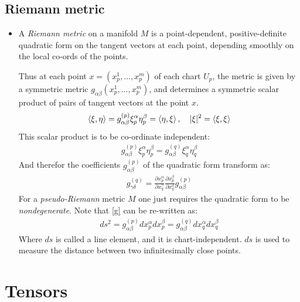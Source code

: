 \documentclass[11pt]{article}
\numberwithin{equation}{section}
\begin{document}
\subsection{Riemann metric}
\begin{itemize}
  \item A \emph{Riemann metric} on a manifold $M$ is a point-dependent, positive-definite quadratic form on the tangent vectors at each point, depending smoothly on the local co-ords of the points. 

  Thus at each point $x = (x^{1}_{p},\ldots,x^{m}_p)$ of each chart $U_{p}$, the metric is given by a symmetric metric $g_{\alpha\beta}(x^{1}_{p},...,x^{m}_p)$, and determines a symmetric scalar product of pairs of tangent vectors at the point $x$. 
  \begin{align*}
     \braket{\xi, \eta}  = g_{\alpha\beta}^{(p)}\xi^{\alpha}_{p}\eta^{\beta}_{p} = \braket{\eta,\xi}, ~~~ |\xi|^2 = \braket{\xi,\xi}
   \end{align*} 
   This scalar product is to be co-ordinate independent:
   \begin{align*}
     g_{\alpha\beta}^{(p)}\xi^{\alpha}_{p}\eta^{\beta}_{p} = g_{\alpha\beta}^{(q)}\xi^{\alpha}_{q}\eta^{\beta}_{q}
   \end{align*}
   And therefor the coefficients $g_{\alpha\beta}^{(p)}$ of the quadratic form transform as:
   \begin{align}
   \label{g}
     g_{\gamma\delta}^{(q)}  = \frac{\partial x^{\alpha}_{p}}{\partial x^{\gamma}_{q}}\frac{\partial x^{\beta}_p}{\partial x^{\delta}_{q}}g_{\alpha\beta}^{(p)} 
   \end{align}
   For a \emph{pseudo-Riemann} metric $M$ one just requires the quadratic form to be \emph{nondegenerate}. Note that \ref{g} can be re-written as:
   \begin{align*}
     ds^2 = g_{\alpha\beta}^{(p)}dx^{\alpha}_{p}dx^{\beta}_{p} =g_{\alpha\beta}^{(q)}dx^{\alpha}_{q}dx^{\beta}_{q}  
   \end{align*}
   Where $ds$ is called a line element, and it is chart-independent. $ds$ is used to measure the distance between two infinitesimally close points. 
\end{itemize}

\newpage 
\section{Tensors}
\end{document}
